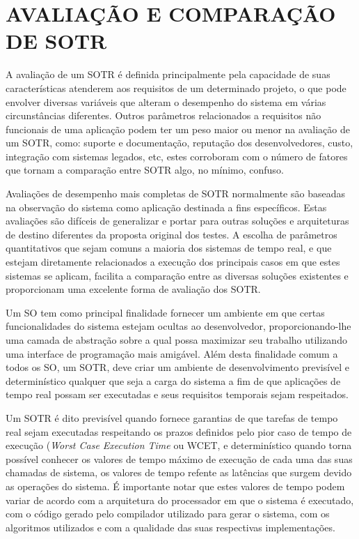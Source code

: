 \chapter{AVALIAÇÃO E COMPARAÇÃO DE SOTR}
\label{cap:projeto}

A avaliação de um SOTR é definida principalmente pela capacidade de suas características atenderem aos requisitos de um determinado projeto, o que pode envolver diversas variáveis que alteram o desempenho do sistema em várias circunstâncias diferentes. Outros parâmetros relacionados a requisitos não funcionais de uma aplicação podem ter um peso maior ou menor na avaliação de um SOTR, como: suporte e documentação, reputação dos desenvolvedores, custo, integração com sistemas legados, etc, estes corroboram com o número de fatores que tornam a comparação entre SOTR algo, no mínimo, confuso.

Avaliações de desempenho mais completas de SOTR normalmente são baseadas na observação do sistema como aplicação destinada a fins específicos. Estas avaliações são difíceis de generalizar e portar para outras soluções e arquiteturas de destino diferentes da proposta original dos testes. A escolha de parâmetros quantitativos que sejam comuns a maioria dos sistemas de tempo real, e que estejam diretamente relacionados a execução dos principais casos em que estes sistemas se aplicam, facilita a comparação entre as diversas soluções existentes e proporcionam uma excelente forma de avaliação dos SOTR.

Um SO tem como principal finalidade fornecer um ambiente em que certas funcionalidades do sistema estejam ocultas ao desenvolvedor, proporcionando-lhe uma camada de abstração sobre a qual possa maximizar seu trabalho utilizando uma interface de programação mais amigável. Além desta finalidade comum a todos os SO, um SOTR, deve criar um ambiente de desenvolvimento previsível e determinístico qualquer que seja a carga do sistema a fim de que aplicações de tempo real possam ser executadas e seus requisitos temporais sejam respeitados. 

Um SOTR é dito previsível quando fornece garantias de que tarefas de tempo real sejam executadas respeitando os prazos definidos pelo pior caso de tempo de execução (\textit{Worst Case Execution Time} ou WCET, e determinístico quando torna possível conhecer os valores de tempo máximo de execução de cada uma das suas chamadas de sistema, os valores de tempo refente as latências que surgem devido as operações do sistema. É importante notar que estes valores de tempo podem variar de acordo com a arquitetura do processador em que o sistema é executado, com o código gerado pelo compilador utilizado para gerar o sistema, com os algoritmos utilizados e com a qualidade das suas respectivas implementações.

